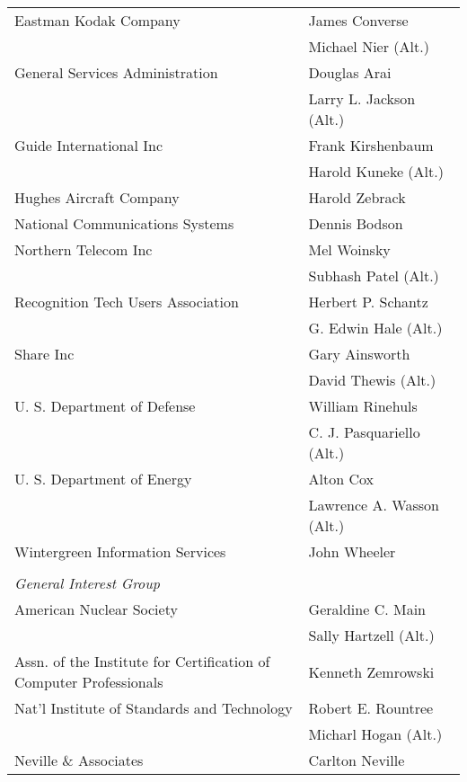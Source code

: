 \begin{supertabular}{p{0.65\linewidth}p{0.35\linewidth}}
Eastman Kodak Company			\dotfill& James Converse \\
										& Michael Nier (Alt.) \\
General Services Administration	\dotfill& Douglas Arai \\
										& Larry L. Jackson (Alt.) \\
Guide International Inc			\dotfill& Frank Kirshenbaum \\
										& Harold Kuneke (Alt.) \\
Hughes Aircraft Company			\dotfill& Harold Zebrack \\
National Communications Systems \dotfill& Dennis Bodson \\
Northern Telecom Inc			\dotfill& Mel Woinsky \\
										& Subhash Patel (Alt.) \\
\footnotemark[2]
Recognition Tech Users Association	\dotfill& Herbert P. Schantz \\
										& G. Edwin Hale (Alt.) \\
Share Inc						\dotfill& Gary Ainsworth \\
										& David Thewis (Alt.) \\
U. S. Department of Defense		\dotfill& William Rinehuls \\
										& C. J. Pasquariello (Alt.) \\
U. S. Department of Energy		\dotfill& Alton Cox \\
										& Lawrence A. Wasson (Alt.) \\
Wintergreen Information Services\dotfill& John Wheeler \\
\\
\emph{General Interest Group} \\
American Nuclear Society		\dotfill& Geraldine C. Main \\
										& Sally Hartzell (Alt.)\\
Assn. of the Institute for Certification of Computer Professionals
								\dotfill& Kenneth Zemrowski \\
Nat'l Institute of Standards and Technology
								\dotfill& Robert E. Rountree \\
										& Micharl Hogan (Alt.) \\
Neville \& Associates			\dotfill& Carlton Neville \\
\end{supertabular}


